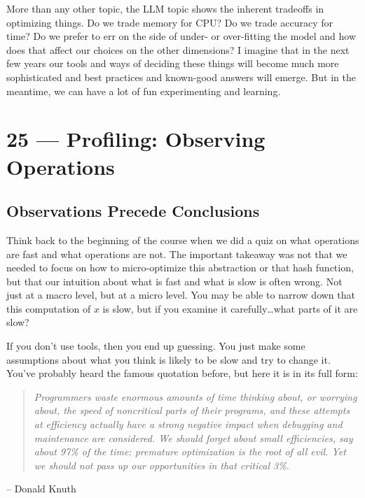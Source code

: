 \documentclass[a4paper]{report}
\begin{document}
More than any other topic, the LLM topic shows the inherent tradeoffs in optimizing things. Do we trade memory for CPU? Do we trade accuracy for time? Do we prefer to err on the side of under- or over-fitting the model and how does that affect our choices on the other dimensions? I imagine that in the next few years our tools and ways of deciding these things will become much more sophisticated and best practices and known-good answers will emerge. But in the meantime, we can have a lot of fun experimenting and learning.









\chapter*{25 --- Profiling: Observing Operations}


\section*{Observations Precede Conclusions}

Think back to the beginning of the course when we did a quiz on what operations are fast and what operations are not. The important takeaway was not that we needed to focus on how to micro-optimize this abstraction or that hash function, but that our intuition about what is fast and what is slow is often wrong. Not just at a macro level, but at a micro level. You may be able to narrow down that this computation of $x$ is slow, but if you examine it carefully\ldots what parts of it are slow?

If you don't use tools, then you end up guessing. You just make some assumptions about what you think is likely to be slow and try to change it. You've probably heard the famous quotation before, but here it is in its full form:

\begin{quote}
\textit{Programmers waste enormous amounts of time thinking about, or worrying about, the speed of noncritical parts of their programs, and these attempts at efficiency actually have a strong negative impact when debugging and maintenance are considered. We should forget about small efficiencies, say about 97\% of the time: premature optimization is the root of all evil. Yet we should not pass up our opportunities in that critical 3\%.}
\end{quote}
	\hfill -- Donald Knuth
\end{document}
